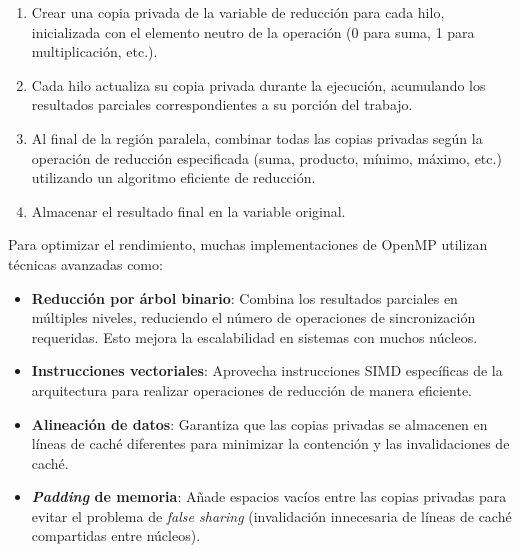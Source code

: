             \begin{enumerate}
            
                \item Crear una copia privada de la variable de reducción para cada hilo, inicializada con el elemento neutro de la operación (0 para suma, 1 para multiplicación, etc.).
                
                \item Cada hilo actualiza su copia privada durante la ejecución, acumulando los resultados parciales correspondientes a su porción del trabajo.
                
                \item Al final de la región paralela, combinar todas las copias privadas según la operación de reducción especificada (suma, producto, mínimo, máximo, etc.) utilizando un algoritmo eficiente de reducción.
                
                \item Almacenar el resultado final en la variable original.
                
            \end{enumerate}
            
            Para optimizar el rendimiento, muchas implementaciones de OpenMP utilizan técnicas avanzadas como:
            
            \begin{itemize}
            
                \item \textbf{Reducción por árbol binario}: Combina los resultados parciales en múltiples niveles, reduciendo el número de operaciones de sincronización requeridas. Esto mejora la escalabilidad en sistemas con muchos núcleos.
                
                \item \textbf{Instrucciones vectoriales}: Aprovecha instrucciones SIMD específicas de la arquitectura para realizar operaciones de reducción de manera eficiente.
                
                \item \textbf{Alineación de datos}: Garantiza que las copias privadas se almacenen en líneas de caché diferentes para minimizar la contención y las invalidaciones de caché.
                
                \item \textbf{\textit{Padding} de memoria}: Añade espacios vacíos entre las copias privadas para evitar el problema de \textit{false sharing} (invalidación innecesaria de líneas de caché compartidas entre núcleos).
            
            \end{itemize}

